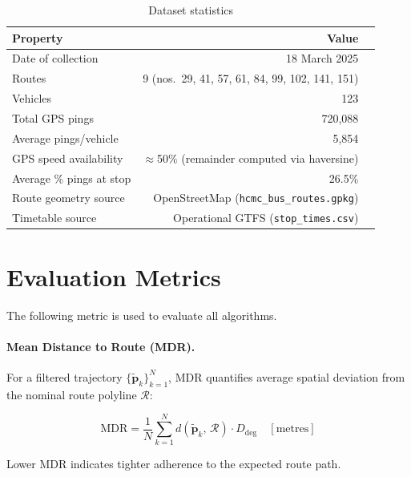 \documentclass[12pt, a4paper]{article}
\begin{document}
\begin{table}[H]
\centering
\caption{Dataset statistics}
\label{tab:dataset}
\begin{tabular}{lrr}
\toprule
\textbf{Property} & \textbf{Value} \\
\midrule
Date of collection       & 18 March 2025 \\
Routes                   & 9 (nos.\ 29, 41, 57, 61, 84, 99, 102, 141, 151) \\
Vehicles                 & 123 \\
Total GPS pings          & 720,088 \\
Average pings/vehicle    & 5,854 \\
GPS speed availability   & $\approx$50\% (remainder computed via haversine) \\
Average \% pings at stop & 26.5\% \\
Route geometry source    & OpenStreetMap (\texttt{hcmc\_bus\_routes.gpkg}) \\
Timetable source         & Operational GTFS (\texttt{stop\_times.csv}) \\
\bottomrule
\end{tabular}
\end{table}

\section{Evaluation Metrics}
\label{sec:metrics}

The following metric is used to evaluate all algorithms.

\paragraph{Mean Distance to Route (MDR).}
For a filtered trajectory $\{\tilde{\mathbf{p}}_k\}_{k=1}^{N}$, MDR quantifies
average spatial deviation from the nominal route polyline $\mathcal{R}$:

\begin{equation}
    \text{MDR} = \frac{1}{N}\sum_{k=1}^{N}
        d\!\left(\tilde{\mathbf{p}}_k,\, \mathcal{R}\right) \cdot D_{\text{deg}}
    \quad [\text{metres}]
    \label{eq:mdr}
\end{equation}

Lower MDR indicates tighter adherence to the expected route path.
\end{document}
